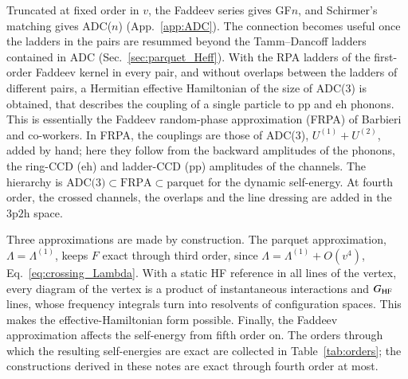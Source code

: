 \documentclass[aip,jcp,reprint,noshowkeys,superscriptaddress]{revtex4-1}
\newcommand{\ppphh}{\text{3p2h}}
\newcommand{\eh}{\text{eh}}
\newcommand{\pp}{\text{pp}}
\begin{document}
Truncated at fixed order in $v$, the Faddeev series gives GF$n$, and
Schirmer's matching gives ADC($n$) (App.~\ref{app:ADC}). The connection
becomes useful once the ladders in the pairs are resummed beyond the
Tamm--Dancoff ladders contained in ADC (Sec.~\ref{sec:parquet_Heff}).
With the RPA ladders of the first-order Faddeev kernel in every pair,
and without overlaps between the ladders of different pairs, a
Hermitian effective Hamiltonian of the size of ADC(3) is obtained, that
describes the coupling of a single particle to $\pp$ and $\eh$
phonons. This is essentially the Faddeev random-phase approximation
(FRPA) of Barbieri and co-workers.\cite{Barbieri2001,
barbieri2003extension,barbieri2007quasiparticles,Degroote2011}
In FRPA, the couplings are those of ADC(3), $U^{(1)}+U^{(2)}$, added by
hand;\cite{Degroote2011} here they follow from the backward amplitudes
of the phonons, the ring-CCD ($\eh$) and ladder-CCD ($\pp$) amplitudes
of the channels.\cite{Scuseria2013} The hierarchy is
$\text{ADC(3)}\subset\text{FRPA}\subset\text{parquet}$ for the dynamic
self-energy. At fourth order, the crossed channels, the overlaps and the
line dressing are added in the $\ppphh$ space.

Three approximations are made by construction. The parquet
approximation, $\Lambda=\Lambda^{(1)}$, keeps $F$ exact through third
order, since $\Lambda=\Lambda^{(1)}+O(v^4)$,
Eq.~\eqref{eq:crossing_Lambda}. With a static HF reference in all lines
of the vertex, every diagram of the vertex is a product of
instantaneous interactions and $G_{\rm HF}$ lines, whose frequency
integrals turn into resolvents of configuration spaces. This makes the
effective-Hamiltonian form possible. Finally, the Faddeev approximation
affects the self-energy from fifth order on. The orders through which
the resulting self-energies are exact are collected in
Table~\ref{tab:orders}; the constructions derived in these notes are exact through fourth order at most.
\end{document}
